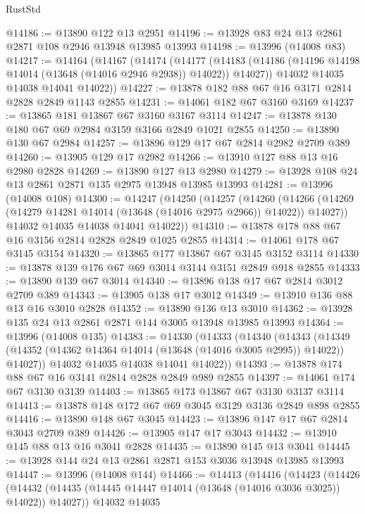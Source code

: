 \begin{lexlean}{RustStd}
\begin{coremodule}
@14186 := @13890 @122 @13 @2951
@14196 := @13928 @83 @24 @13 @2861 @2871 @108 @2946 @13948 @13985 @13993
@14198 := @13996 (@14008 @83)
@14217 := @14164
    (@14167
      (@14174
        (@14177
          (@14183 (@14186 (@14196 @14198 @14014 (@13648 (@14016 @2946 @2938)) @14022)) @14027))
        @14032
        @14035
        @14038
        @14041
        @14022))
@14227 := @13878 @182 @88 @67 @16 @3171 @2814 @2828 @2849 @1143 @2855
@14231 := @14061 @182 @67 @3160 @3169
@14237 := @13865 @181 @13867 @67 @3160 @3167 @3114
@14247 := @13878 @130 @180 @67 @69 @2984 @3159 @3166 @2849 @1021 @2855
@14250 := @13890 @130 @67 @2984
@14257 := @13896 @129 @17 @67 @2814 @2982 @2709 @389
@14260 := @13905 @129 @17 @2982
@14266 := @13910 @127 @88 @13 @16 @2980 @2828
@14269 := @13890 @127 @13 @2980
@14279 := @13928 @108 @24 @13 @2861 @2871 @135 @2975 @13948 @13985 @13993
@14281 := @13996 (@14008 @108)
@14300 := @14247
    (@14250
      (@14257
        (@14260
          (@14266 (@14269 (@14279 @14281 @14014 (@13648 (@14016 @2975 @2966)) @14022)) @14027))
        @14032
        @14035
        @14038
        @14041
        @14022))
@14310 := @13878 @178 @88 @67 @16 @3156 @2814 @2828 @2849 @1025 @2855
@14314 := @14061 @178 @67 @3145 @3154
@14320 := @13865 @177 @13867 @67 @3145 @3152 @3114
@14330 := @13878 @139 @176 @67 @69 @3014 @3144 @3151 @2849 @918 @2855
@14333 := @13890 @139 @67 @3014
@14340 := @13896 @138 @17 @67 @2814 @3012 @2709 @389
@14343 := @13905 @138 @17 @3012
@14349 := @13910 @136 @88 @13 @16 @3010 @2828
@14352 := @13890 @136 @13 @3010
@14362 := @13928 @135 @24 @13 @2861 @2871 @144 @3005 @13948 @13985 @13993
@14364 := @13996 (@14008 @135)
@14383 := @14330
    (@14333
      (@14340
        (@14343
          (@14349 (@14352 (@14362 @14364 @14014 (@13648 (@14016 @3005 @2995)) @14022)) @14027))
        @14032
        @14035
        @14038
        @14041
        @14022))
@14393 := @13878 @174 @88 @67 @16 @3141 @2814 @2828 @2849 @989 @2855
@14397 := @14061 @174 @67 @3130 @3139
@14403 := @13865 @173 @13867 @67 @3130 @3137 @3114
@14413 := @13878 @148 @172 @67 @69 @3045 @3129 @3136 @2849 @898 @2855
@14416 := @13890 @148 @67 @3045
@14423 := @13896 @147 @17 @67 @2814 @3043 @2709 @389
@14426 := @13905 @147 @17 @3043
@14432 := @13910 @145 @88 @13 @16 @3041 @2828
@14435 := @13890 @145 @13 @3041
@14445 := @13928 @144 @24 @13 @2861 @2871 @153 @3036 @13948 @13985 @13993
@14447 := @13996 (@14008 @144)
@14466 := @14413
    (@14416
      (@14423
        (@14426
          (@14432 (@14435 (@14445 @14447 @14014 (@13648 (@14016 @3036 @3025)) @14022)) @14027))
        @14032
        @14035

\end{coremodule}
\end{lexlean}
